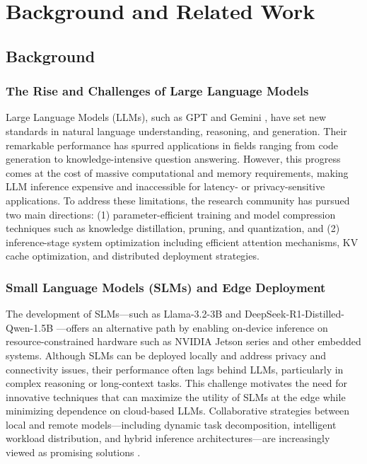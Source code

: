 \chapter{Background and Related Work}
\label{chapter:background}

\section{Background}
\subsection{The Rise and Challenges of Large Language Models}
Large Language Models (LLMs), such as GPT and Gemini \cite{Vaswani2017Attention}, have set new standards in natural language understanding, reasoning, and generation. Their remarkable performance has spurred applications in fields ranging from code generation to knowledge-intensive question answering. However, this progress comes at the cost of massive computational and memory requirements, making LLM inference expensive and inaccessible for latency- or privacy-sensitive applications. To address these limitations, the research community has pursued two main directions: (1) parameter-efficient training and model compression techniques such as knowledge distillation, pruning, and quantization, and (2) inference-stage system optimization including efficient attention mechanisms, KV cache optimization, and distributed deployment strategies.

\subsection{Small Language Models (SLMs) and Edge Deployment}
The development of SLMs—such as Llama-3.2-3B \cite{Touvron2023LLaMA} and DeepSeek-R1-Distilled-Qwen-1.5B \cite{DeepSeek-RL}—offers an alternative path by enabling on-device inference on resource-constrained hardware such as NVIDIA Jetson series and other embedded systems. Although SLMs can be deployed locally and address privacy and connectivity issues, their performance often lags behind LLMs, particularly in complex reasoning or long-context tasks. This challenge motivates the need for innovative techniques that can maximize the utility of SLMs at the edge while minimizing dependence on cloud-based LLMs. Collaborative strategies between local and remote models—including dynamic task decomposition, intelligent workload distribution, and hybrid inference architectures—are increasingly viewed as promising solutions \cite{Narayan2025Minions}.

